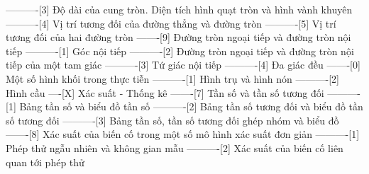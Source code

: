 ----------[3] Độ dài của cung tròn. Diện tích hình quạt tròn và hình vành khuyên
----------[4] Vị trí tương đối của đường thẳng và đường tròn
----------[5] Vị trí tương đối của hai đường tròn
-------[9] Đường tròn ngoại tiếp và đường tròn nội tiếp
----------[1] Góc nội tiếp
----------[2] Đường tròn ngoại tiếp và đường tròn nội tiếp của một tam giác
----------[3] Tứ giác nội tiếp
----------[4] Đa giác đều
-------[0] Một số hình khối trong thực tiễn
----------[1] Hình trụ và hình nón
----------[2] Hình cầu
----[X] Xác suất - Thống kê
-------[7] Tần số và tần số tương đối
----------[1] Bảng tần số và biểu đồ tần số
----------[2] Bảng tần số tương đối và biểu đồ tần số tương đối
----------[3] Bảng tần số, tần số tương đối ghép nhóm và biểu đồ
-------[8] Xác suất của biến cố trong một số mô hình xác suất đơn giản
----------[1] Phép thử ngẫu nhiên và không gian mẫu
----------[2] Xác suất của biến cố liên quan tới phép thử
